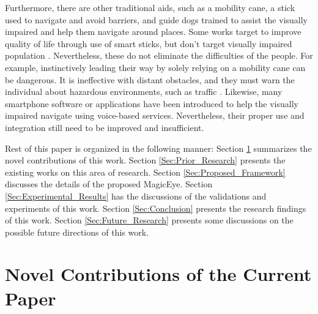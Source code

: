 \documentclass[journal,12pt,onecolumn,letterpaper]{IEEEtran}
\begin{document}
Furthermore, there are other traditional aids, such as a mobility cane, a stick used to navigate and avoid barriers, and guide dogs trained to assist the visually impaired and help them navigate around places. Some works target to improve quality of life through use of smart sticks, but don't target visually impaired population \cite{Rachakonda_IFIP-IoT_2021, Rachakonda_IFIP-IoT_2019}. Nevertheless, these do not eliminate the difficulties of the people. For example, instinctively leading their way by solely relying on a mobility cane can be dangerous. It is ineffective with distant obstacles, and they must warn the individual about hazardous environments, such as traffic \cite{calder_ecological_2010}. Likewise, many smartphone software or applications have been introduced to help the visually impaired navigate using voice-based services. Nevertheless, their proper use and integration still need to be improved and insufficient. 

Rest of this paper is organized in the following manner: Section \ref{Sec:Novel_Contributions} summarizes the novel contributions of this work. Section \ref{Sec:Prior_Research} presents the existing works on this area of research. Section \ref{Sec:Proposed_Framework} discusses the details of the proposed MagicEye. Section \ref{Sec:Experimental_Results} has the discussions of the validations and experiments of this work. Section \ref{Sec:Conclusion} presents the research findings of this work. Section \ref{Sec:Future_Research} presents some discussions on the possible future directions of this work.


\section{Novel Contributions of the Current Paper}
\label{Sec:Novel_Contributions}
\end{document}
